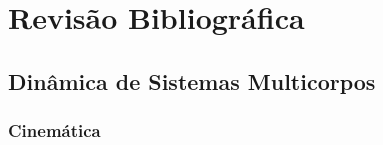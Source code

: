 \chapter{Revisão Bibliográfica}

% 

\section{Dinâmica de Sistemas Multicorpos}

\subsection{Cinemática}\label{sec::cinematica}

